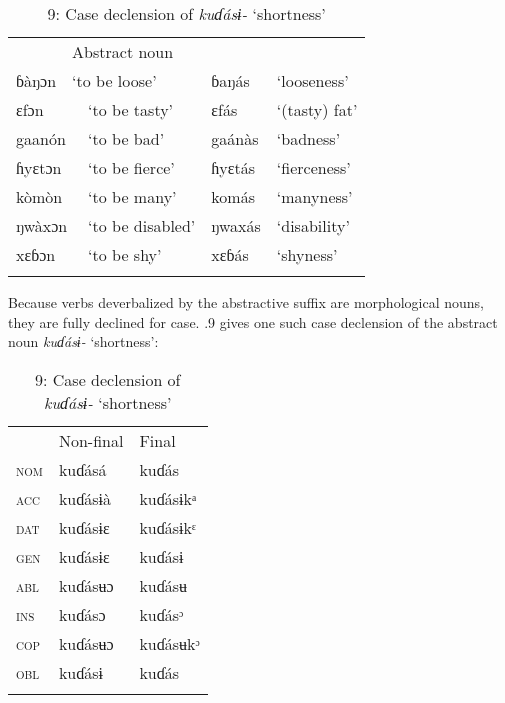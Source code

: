 \begin{table}
\begin{table}
\caption{8: Icétôd abstract nouns derived from verbs}
\label{tab:8}


\begin{tabularx}{\textwidth}{XXXXX}
\lsptoprule

\multicolumn{3}{X}{Intransitive infinitive} & \multicolumn{2}{X}{Abstract noun}\\
ɓàŋɔn & \multicolumn{2}{X}{ ‘to be loose’} & ɓaŋás & ‘looseness’\\
\multicolumn{2}{X}{ɛfɔn} & ‘to be tasty’ & ɛfás & ‘(tasty) fat’\\
\multicolumn{2}{X}{gaanón} & ‘to be bad’ & gaánàs & ‘badness’\\
\multicolumn{2}{X}{ɦyɛtɔn} & ‘to be fierce’ & ɦyɛtás & ‘fierceness’\\
\multicolumn{2}{X}{kòmòn} & ‘to be many’ & komás & ‘manyness’\\
\multicolumn{2}{X}{ŋwàxɔn} & ‘to be disabled’ & ŋwaxás & ‘disability’\\
\multicolumn{2}{X}{xɛɓɔn} & ‘to be shy’ & xɛɓás & ‘shyness’\\
\lspbottomrule
\end{tabularx}
\end{table}
Because verbs deverbalized by the abstractive suffix are morphological nouns, they are fully declined for case. .9 gives one such case declension of the abstract noun \textit{kuɗásɨ- }‘shortness’:


\begin{table}
\caption{9: Case declension of \textit{kuɗásɨ- }‘shortness’}
\label{tab:8}


\begin{tabularx}{\textwidth}{XXX} & Non-final & Final\\
\lsptoprule
\textsc{nom} & kuɗásá & kuɗás\\
\textsc{acc} & kuɗásɨà & kuɗásɨkᵃ\\
\textsc{dat} & kuɗásɨɛ & kuɗásɨkᵋ\\
\textsc{gen} & kuɗásɨɛ & kuɗásɨ\\
\textsc{abl} & kuɗásʉɔ & kuɗásʉ\\
\textsc{ins} & kuɗásɔ & kuɗásᵓ\\
\textsc{cop} & kuɗásʉɔ & kuɗásʉkᵓ\\
\textsc{obl} & kuɗásɨ & kuɗás\\
\lspbottomrule
\end{tabularx}
\end{table}


\end{table}
